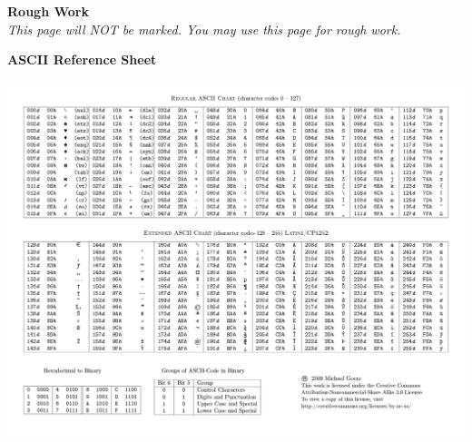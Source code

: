 \documentclass[letterpaper,12pt,addpoints]{exam}
\begin{document}
\clearpage
\begin{center}
    \textbf{Rough Work}\\
    \textit{This page will NOT be marked. You may use this page for rough work.}
\end{center}
\clearpage
\begin{center}
    \textbf{ASCII Reference Sheet}

    \includegraphics[width=0.8\textheight, angle=270]{ascii.jpg}
\end{center}
\end{document}
